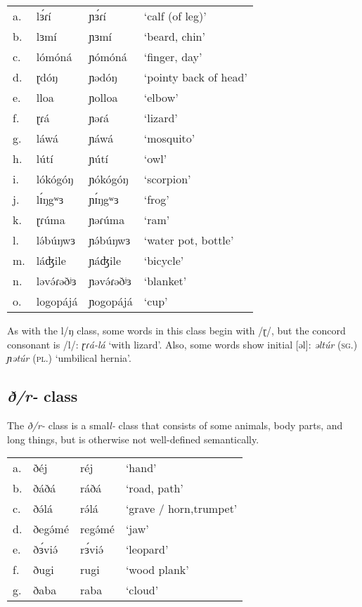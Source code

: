 \ea
\begin{tabular}[t]{llll}
a.	&	lɜ́ɾí	&	ɲɜ́ɾí	&	‘calf (of leg)’\\
b.	&	lɜmí	&	ɲɜmí	&	‘beard, chin’\\
c.	&	lómóná	&	ɲómóná	&	‘finger, day’\\
d.	&	ɽdóŋ	&	ɲədóŋ	&	‘pointy back of head’\\
e.	&	lloa	&	ɲolloa	&	‘elbow’\\
f.	&	ɽɾá		&	ɲəɾá	&	‘lizard’\\
g.	&	láwá	&	ɲáwá	&	‘mosquito’\\
h.	&	lútí	&	ɲútí	&	‘owl’\\
i.	&	lókógóŋ	&	ɲókógóŋ	&	‘scorpion’\\
j.	&	lɪ́ŋgʷɜ	&	ɲɪ́ŋgʷɜ	&	‘frog’\\
k.	&	ɽɾúma	&	ɲəɾúma	&	‘ram’\\
l.	&	lə́búŋwɜ	&	ɲə́búŋwɜ	&	‘water pot, bottle’\\
m.	&	láʤile	&	ɲáʤile	&	‘bicycle’\\
n.	&	ləvə́ɾəðʲɜ&	ɲəvə́ɾəðʲɜ&	‘blanket’\\
o.	&	logopájá&	ɲogopájá&	‘cup’\\
\end{tabular}
\z
As with the l/ŋ class, some words in this class begin with /ɽ/, but the concord consonant is /l/: \textit{ɽɾá-lá} ‘with lizard’. Also, some words show initial [əl]: \textit{əltúr} (\textsc{sg}.) \textit{ɲətúr} (\textsc{pl}.) ‘umbilical hernia’.
		

\subsection{\textit{ð/r-} class}
The \textit{ð/r-} class is a smal\textit{l-} class that consists of some animals, body parts, and long things, but is otherwise not well-defined semantically. 

\ea
\begin{tabular}[t]{llll}
a.	&	ðéj		&	réj		&	‘hand’\\
b.	&	ðáðá	&	ráðá		&	‘road, path’\\
c.	&	ðə́lá		&	rə́lá		&	‘grave / horn,trumpet’\\
d.	&	ðegə́mé	&	regə́mé	&	‘jaw’\\
e.	&	ðɜ́viə́	&	rɜ́viə́	&	‘leopard’\\
f.	&	ðugi	&	rugi		&	‘wood plank’\\
g.	&	ðaba	&	raba		&	‘cloud’\\
\end{tabular}
\z

